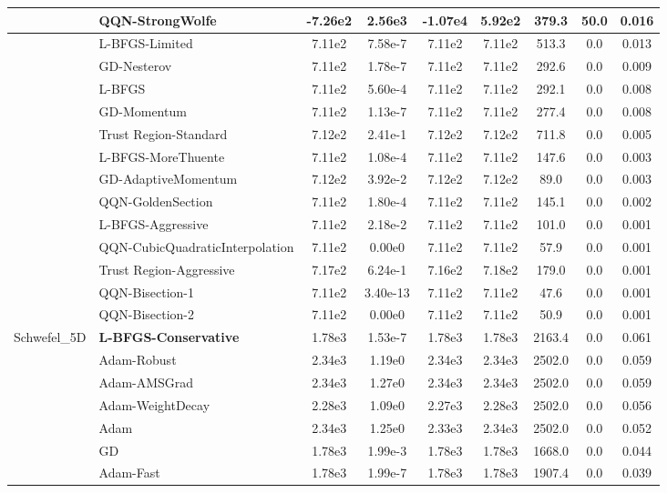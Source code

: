 \documentclass{article}
\begin{document}
\begin{longtable}{|l|l|c|c|c|c|c|c|c|}
\hline
 & QQN-StrongWolfe & -7.26e2 & 2.56e3 & -1.07e4 & 5.92e2 & 379.3 & 50.0 & 0.016 \\
\hline
 & L-BFGS-Limited & 7.11e2 & 7.58e-7 & 7.11e2 & 7.11e2 & 513.3 & 0.0 & 0.013 \\
\hline
 & GD-Nesterov & 7.11e2 & 1.78e-7 & 7.11e2 & 7.11e2 & 292.6 & 0.0 & 0.009 \\
\hline
 & L-BFGS & 7.11e2 & 5.60e-4 & 7.11e2 & 7.11e2 & 292.1 & 0.0 & 0.008 \\
\hline
 & GD-Momentum & 7.11e2 & 1.13e-7 & 7.11e2 & 7.11e2 & 277.4 & 0.0 & 0.008 \\
\hline
 & Trust Region-Standard & 7.12e2 & 2.41e-1 & 7.12e2 & 7.12e2 & 711.8 & 0.0 & 0.005 \\
\hline
 & L-BFGS-MoreThuente & 7.11e2 & 1.08e-4 & 7.11e2 & 7.11e2 & 147.6 & 0.0 & 0.003 \\
\hline
 & GD-AdaptiveMomentum & 7.12e2 & 3.92e-2 & 7.12e2 & 7.12e2 & 89.0 & 0.0 & 0.003 \\
\hline
 & QQN-GoldenSection & 7.11e2 & 1.80e-4 & 7.11e2 & 7.11e2 & 145.1 & 0.0 & 0.002 \\
\hline
 & L-BFGS-Aggressive & 7.11e2 & 2.18e-2 & 7.11e2 & 7.11e2 & 101.0 & 0.0 & 0.001 \\
\hline
 & QQN-CubicQuadraticInterpolation & 7.11e2 & 0.00e0 & 7.11e2 & 7.11e2 & 57.9 & 0.0 & 0.001 \\
\hline
 & Trust Region-Aggressive & 7.17e2 & 6.24e-1 & 7.16e2 & 7.18e2 & 179.0 & 0.0 & 0.001 \\
\hline
 & QQN-Bisection-1 & 7.11e2 & 3.40e-13 & 7.11e2 & 7.11e2 & 47.6 & 0.0 & 0.001 \\
\hline
 & QQN-Bisection-2 & 7.11e2 & 0.00e0 & 7.11e2 & 7.11e2 & 50.9 & 0.0 & 0.001 \\
Schwefel\_5D & \textbf{L-BFGS-Conservative} & 1.78e3 & 1.53e-7 & 1.78e3 & 1.78e3 & 2163.4 & 0.0 & 0.061 \\
\hline
 & Adam-Robust & 2.34e3 & 1.19e0 & 2.34e3 & 2.34e3 & 2502.0 & 0.0 & 0.059 \\
\hline
 & Adam-AMSGrad & 2.34e3 & 1.27e0 & 2.34e3 & 2.34e3 & 2502.0 & 0.0 & 0.059 \\
\hline
 & Adam-WeightDecay & 2.28e3 & 1.09e0 & 2.27e3 & 2.28e3 & 2502.0 & 0.0 & 0.056 \\
\hline
 & Adam & 2.34e3 & 1.25e0 & 2.33e3 & 2.34e3 & 2502.0 & 0.0 & 0.052 \\
\hline
 & GD & 1.78e3 & 1.99e-3 & 1.78e3 & 1.78e3 & 1668.0 & 0.0 & 0.044 \\
\hline
 & Adam-Fast & 1.78e3 & 1.99e-7 & 1.78e3 & 1.78e3 & 1907.4 & 0.0 & 0.039 \\

\end{longtable}
\end{document}
